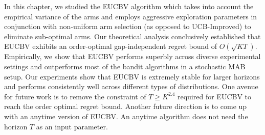 In this chapter, we studied the EUCBV algorithm which takes into account the empirical variance of the arms and employs aggressive exploration parameters in conjunction with non-uniform arm selection (as opposed to UCB-Improved) to eliminate sub-optimal arms. Our theoretical analysis conclusively established that EUCBV exhibits an order-optimal gap-independent regret bound of $O\left(\sqrt{KT}\right)$. Empirically, we show that EUCBV performs superbly across diverse experimental settings and outperforms most of the bandit algorithms in a  stochastic MAB setup. Our experiments show that EUCBV is extremely stable for larger horizons and performs consistently well across different types of distributions. One avenue for future work is to remove the constraint of $T\geq K^{2.4}$ required for EUCBV to reach the order optimal regret bound. Another future direction is to come up with an anytime version of EUCBV. An anytime algorithm does not need the horizon $T$ as an input parameter.


